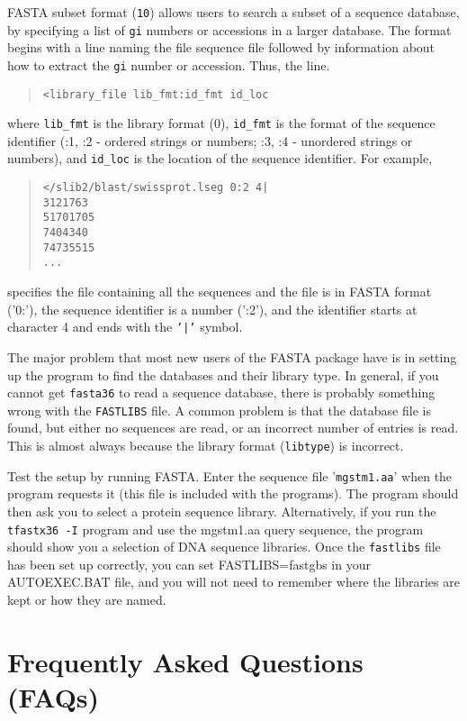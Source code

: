 \documentclass[11pt]{article}
\begin{document}
FASTA subset format ({\tt 10}) allows users to search a subset of a
sequence database, by specifying a list of {\tt gi} numbers or accessions in
a larger database.  The format begins with a line naming the file
sequence file followed by information about how to
extract the {\tt gi} number or accession. Thus, the line.
\begin{quote}
\texttt{<library\_file lib\_fmt:id\_fmt id\_loc}
\end{quote}
where {\tt lib\_fmt} is the library format (0), {\tt id\_fmt} is the
format of the sequence identifier (:1, :2 - ordered strings or
numbers; :3, :4 - unordered strings or numbers),
and {\tt id\_loc} is the location of the sequence identifier. For example,
\begin{quote}
\begin{verbatim}
</slib2/blast/swissprot.lseg 0:2 4|
3121763
51701705
7404340
74735515
...
\end{verbatim}
\end{quote}
specifies the file containing all the sequences and the file is in
FASTA format ('0:'), the sequence identifier is a number (':2'),
and the identifier starts at character 4 and ends with the \texttt{'|'} symbol. 

The major problem that most new users of the FASTA package have is in
setting up the program to find the databases and their library type.
In general, if you cannot get \texttt{fasta36} to read a sequence
database, there is probably something wrong with the \texttt{FASTLIBS}
file.  A common problem is that the database file is found, but either
no sequences are read, or an incorrect number of entries is read.
This is almost always because the library format (\texttt{libtype}) is
incorrect.

Test the setup by running FASTA.  Enter the sequence
file '\texttt{mgstm1.aa}' when the program requests it (this file is
included with the programs).  The program should then ask you to
select a protein sequence library.  Alternatively, if you run the
\texttt{tfastx36 -I} program and use the mgstm1.aa query sequence, the program
should show you a selection of DNA sequence libraries.
Once the \texttt{fastlibs} file has been set up correctly, you can
set FASTLIBS=fastgbs in your AUTOEXEC.BAT file, and you will not need to
remember where the libraries are kept or how they are named.

\section{Frequently Asked Questions (FAQs)}
\end{document}
